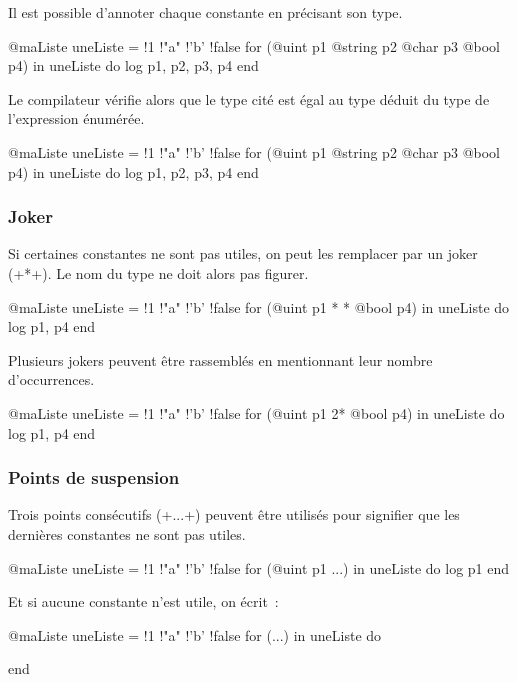 Il est possible d'annoter chaque constante en précisant son type.

\begin{galgas}
@maListe uneListe = {!1 !"a" !'b' !false}
for (@uint p1 @string p2 @char p3 @bool p4) in uneListe do
  log p1, p2, p3, p4
end
\end{galgas}

Le compilateur vérifie alors que le type cité est égal au type déduit du type de l'expression énumérée.
\begin{galgas}
@maListe uneListe = {!1 !"a" !'b' !false}
for (@uint p1 @string p2 @char p3 @bool p4) in uneListe do
  log p1, p2, p3, p4
end
\end{galgas}


\subsubsection{Joker}

Si certaines constantes ne sont pas utiles, on peut les remplacer par un joker (\ggs+*+). Le nom du type ne doit alors pas figurer.
\begin{galgas}
@maListe uneListe = {!1 !"a" !'b' !false}
for (@uint p1 * * @bool p4) in uneListe do
  log p1, p4
end
\end{galgas}

Plusieurs jokers peuvent être rassemblés en mentionnant leur nombre d'occurrences.
\begin{galgas}
@maListe uneListe = {!1 !"a" !'b' !false}
for (@uint p1 2* @bool p4) in uneListe do
  log p1, p4
end
\end{galgas}



\subsubsection{Points de suspension}

Trois points consécutifs (\ggs+...+) peuvent être utilisés pour signifier que les dernières constantes ne sont pas utiles.

\begin{galgas}
@maListe uneListe = {!1 !"a" !'b' !false}
for (@uint p1 ...) in uneListe do
  log p1
end
\end{galgas}

Et si aucune constante n'est utile, on écrit~:
\begin{galgas}
@maListe uneListe = {!1 !"a" !'b' !false}
for (...) in uneListe do

end
\end{galgas}






